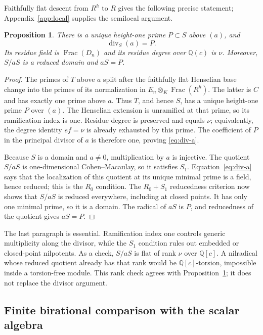 \documentclass[11pt]{article}
\newtheorem{proposition}[theorem]{Proposition}
\theoremstyle{definition}
\theoremstyle{remark}
\newcommand{\Q}{\mathbb{Q}}
\newcommand{\Frac}{\operatorname{Frac}}
\newcommand{\divisor}{\operatorname{div}}
\begin{document}
Faithfully flat descent from $R^h$ to $R$ gives the following precise
statement; Appendix~\ref{app:local} supplies the semilocal argument.

\begin{proposition}\label{prop:a-divisor}
There is a unique height-one prime $P\subset S$ above $(a)$, and
\begin{equation}\label{eq:div-a}
 \divisor_S(a)=P.
\end{equation}
Its residue field is $\Frac(D_n)$ and its residue degree over
$\Q(c)$ is $\nu$.  Moreover, $S/aS$ is a reduced domain and $aS=P$.
\end{proposition}

\begin{proof}
The primes of $T$ above $a$ split after the faithfully flat Henselian base
change into the primes of its normalization in
$E_n\otimes_K\Frac(R^h)$.  The latter is $C$ and has exactly one prime above
$a$.  Thus $T$, and hence $S$, has a unique height-one prime $P$ over $(a)$.
The Henselian extension is unramified at that prime, so its ramification
index is one.  Residue degree is preserved and equals $\nu$; equivalently,
the degree identity $ef=\nu$ is already exhausted by this prime.  The
coefficient of $P$ in the principal divisor of $a$ is therefore one, proving
\eqref{eq:div-a}.

Because $S$ is a domain and $a\ne0$, multiplication by $a$ is injective.
The quotient $S/aS$ is one-dimensional Cohen--Macaulay, so it satisfies
$S_1$.  Equation~\eqref{eq:div-a} says that the localization of this
quotient at its unique minimal prime is a field, hence reduced; this is the
$R_0$ condition.  The $R_0+S_1$ reducedness criterion
\citep{stacks-033p} now shows that $S/aS$ is reduced everywhere, including
at closed points.  It has only one minimal prime, so it is a domain.  The
radical of $aS$ is $P$, and reducedness of the quotient gives $aS=P$.
\end{proof}

The last paragraph is essential.  Ramification index one controls generic
multiplicity along the divisor, while the $S_1$ condition rules out embedded
or closed-point nilpotents.  As a check, $S/aS$ is flat of rank $\nu$ over
$\Q[c]$.  A nilradical whose reduced quotient already has that rank would be
$\Q[c]$-torsion, impossible inside a torsion-free module.  This rank check
agrees with Proposition~\ref{prop:a-divisor}; it does not replace the
divisor argument.

\subsection{Finite birational comparison with the scalar algebra}
\end{document}
